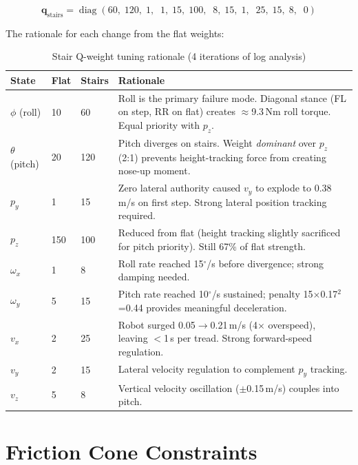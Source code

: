 \documentclass[12pt,a4paper]{report}
\newcommand{\vect}[1]{\bm{#1}}
\DeclareMathOperator{\diag}{diag}
\begin{document}
\begin{equation}
    \vect{q}_\text{stairs} = \diag(60,\; 120,\; 1,\;\; 1,\; 15,\; 100,\;\; 8,\; 15,\; 1,\;\; 25,\; 15,\; 8,\;\; 0)
\end{equation}

The rationale for each change from the flat weights:

\begin{table}[H]
\centering
\caption{Stair Q-weight tuning rationale (4 iterations of log analysis)}
\begin{tabular}{p{1cm}p{2cm}p{2.5cm}p{7cm}}
\toprule
\textbf{State} & \textbf{Flat} & \textbf{Stairs} & \textbf{Rationale} \\
\midrule
$\phi$ (roll)   & 10  & 60  & Roll is the primary failure mode. Diagonal stance (FL on step, RR on flat) creates $\approx$9.3\,Nm roll torque. Equal priority with $p_z$. \\
$\theta$ (pitch)& 20  & 120 & Pitch diverges on stairs. Weight \emph{dominant} over $p_z$ (2:1) prevents height-tracking force from creating nose-up moment. \\
$p_y$           & 1   & 15  & Zero lateral authority caused $v_y$ to explode to 0.38\,m/s on first step. Strong lateral position tracking required. \\
$p_z$           & 150 & 100 & Reduced from flat (height tracking slightly sacrificed for pitch priority). Still 67\% of flat strength. \\
$\omega_x$      & 1   & 8   & Roll rate reached 15$^\circ$/s before divergence; strong damping needed. \\
$\omega_y$      & 5   & 15  & Pitch rate reached 10$^\circ$/s sustained; penalty 15$\times$0.17$^2$=0.44 provides meaningful deceleration. \\
$v_x$           & 2   & 25  & Robot surged 0.05$\to$0.21\,m/s (4$\times$ overspeed), leaving $<$1\,s per tread. Strong forward-speed regulation. \\
$v_y$           & 2   & 15  & Lateral velocity regulation to complement $p_y$ tracking. \\
$v_z$           & 5   & 8   & Vertical velocity oscillation ($\pm$0.15\,m/s) couples into pitch. \\
\bottomrule
\end{tabular}
\end{table}

\section{Friction Cone Constraints}
\end{document}
